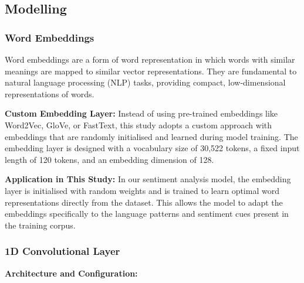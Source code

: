 \documentclass{article}
\begin{document}
\subsection{Modelling}

\subsubsection{Word Embeddings}

Word embeddings are a form of word representation in which words with similar meanings are mapped to similar vector representations. They are fundamental to natural language processing (NLP) tasks, providing compact, low-dimensional representations of words.

\textbf{Custom Embedding Layer:} Instead of using pre-trained embeddings like Word2Vec, GloVe, or FastText, this study adopts a custom approach with embeddings that are randomly initialised and learned during model training. The embedding layer is designed with a vocabulary size of 30,522 tokens, a fixed input length of 120 tokens, and an embedding dimension of 128.

\textbf{Application in This Study:} In our sentiment analysis model, the embedding layer is initialised with random weights and is trained to learn optimal word representations directly from the dataset. This allows the model to adapt the embeddings specifically to the language patterns and sentiment cues present in the training corpus.

\subsubsection{1D Convolutional Layer}

\textbf{Architecture and Configuration:}
\end{document}

